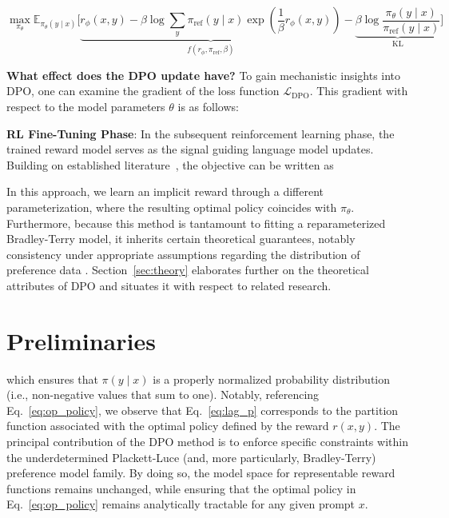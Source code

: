 \begin{equation}\label{eq:AC}
    \max_{\pi_{\theta}}\mathbb{E}_{\pi_{\theta}(y\mid x)}\bigg[\underbrace{r_{\phi}(x, y) -\beta\log\sum_{y}\pi_\text{ref}(y\mid x)\exp\left(\frac{1}{\beta}r_{\phi}(x, y)\right)}_{f(r_{\phi}, \pi_\text{ref}, \beta)} - \underbrace{\beta\log\frac{\pi_{\theta}(y\mid x)}{\pi_\text{ref}(y\mid x)}}_{\text{KL}}\bigg]
\end{equation}

\textbf{What effect does the DPO update have?} To gain mechanistic insights into DPO, one can examine the gradient of the loss function $\mathcal{L}_\text{DPO}$. This gradient with respect to the model parameters $\theta$ is as follows:

\textbf{RL Fine-Tuning Phase}: In the subsequent reinforcement learning phase, the trained reward model serves as the signal guiding language model updates. Building on established literature~\citep{jaques2017sequence, jaques2020human}, the objective can be written as

In this approach, we learn an implicit reward through a different parameterization, where the resulting optimal policy coincides with $\pi_\theta$. Furthermore, because this method is tantamount to fitting a reparameterized Bradley-Terry model, it inherits certain theoretical guarantees, notably consistency under appropriate assumptions regarding the distribution of preference data \cite{bong2022generalized}. Section~\ref{sec:theory} elaborates further on the theoretical attributes of DPO and situates it with respect to related research.

\section{Preliminaries}\label{section:prelims}

which ensures that $\pi(y\mid x)$ is a properly normalized probability distribution (i.e., non-negative values that sum to one). Notably, referencing Eq.~\ref{eq:op_policy}, we observe that Eq.~\ref{eq:lag_p} corresponds to the partition function associated with the optimal policy defined by the reward $r(x, y)$. The principal contribution of the DPO method is to enforce specific constraints within the underdetermined Plackett-Luce (and, more particularly, Bradley-Terry) preference model family. By doing so, the model space for representable reward functions remains unchanged, while ensuring that the optimal policy in Eq.~\ref{eq:op_policy} remains analytically tractable for any given prompt $x$.

